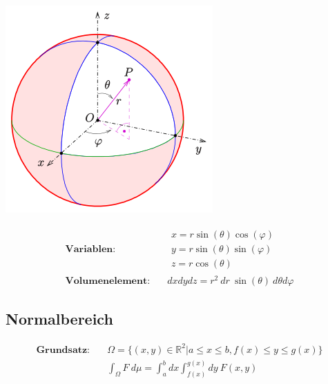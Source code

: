 \documentclass[11pt]{article}
\begin{document}
\begin{minipage}[c]{0.3\textwidth}
\centering
\includegraphics[width=\textwidth]{images/kugelkoordinaten}
\end{minipage}
%
\begin{minipage}[c]{0.7\textwidth}
\begin{equation*}
\begin{split}
	\textbf{Variablen:}\quad & \begin{matrix}
		x = r\sin(\theta)\cos(\varphi) \\ y = r\sin(\theta)\sin(\varphi) \\ z = r\cos(\theta)
	\end{matrix} \\
	\textbf{Volumenelement:} \quad & dxdydz = r^2\ dr\ \sin(\theta)\ d\theta d\varphi
\end{split}
\end{equation*}
\end{minipage}


\subsection{Normalbereich}

\begin{equation*}
\begin{split}
	\textbf{Grundsatz:}\quad & \Omega = \{(x,y) \in \mathbb{R}^2| a \leq x \leq b, f(x) \leq y \leq g(x)\} \\
	& \int_\Omega F\ d\mu = \int_a^b dx \int_{f(x)}^{g(x)} dy\ F(x,y)
\end{split}
\end{equation*}
\end{document}
